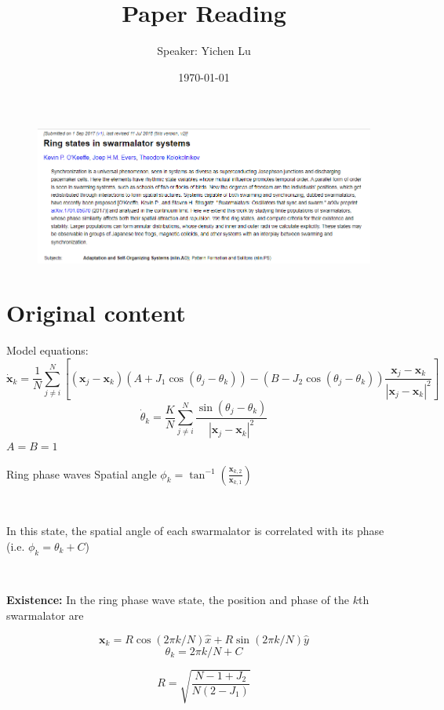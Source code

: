 \documentclass[10pt,aspectratio=43,mathserif,table]{beamer}
\title{Paper Reading}
\author{Speaker: Yichen Lu\quad \newline  \newline \quad }
\institute{\fontsize{8pt}{14pt}}
\date{\today}
\begin{document}
\begin{frame}
    \begin{figure}
        \centering
        \includegraphics[width=\textwidth]{title.png}
    \end{figure}
\end{frame}

\section{Original content}

\begin{frame}
    Model equations:
    {
    \small
    $$
    \dot{\mathbf{x}}_k=\frac{1}{N}\sum_{j\ne i}^N{\left[ \left( \mathbf{x}_j-\mathbf{x}_k \right) \left( A+J_1\cos \left( \theta _j-\theta _k \right) \right) -\left( B-J_2\cos \left( \theta _j-\theta _k \right) \right) \frac{\mathbf{x}_j-\mathbf{x}_k}{\left| \mathbf{x}_j-\mathbf{x}_k \right|^2} \right]}
    $$
    $$
    \dot{\theta}_k=\frac{K}{N}\sum_{j\ne i}^N{\frac{\sin \left( \theta _j-\theta _k \right)}{\left| \mathbf{x}_j-\mathbf{x}_k \right|^2}}
    $$
    }
    $A=B=1$
\end{frame}

\begin{frame}{Ring phase waves}
    Spatial angle $\phi _k=\tan ^{-1}\left( \frac{\mathbf{x}_{k,2}}{\mathbf{x}_{k,1}} \right) $

    $ $

    In this state, the spatial angle of each swarmalator is correlated with its phase (i.e. $\phi _k=\theta _k + C$)

    $ $

    \textbf{Existence: } In the ring phase wave state, the position and phase of the $k$th swarmalator are

    $$
    \mathbf{x}_k=R\cos \left( 2\pi k/N \right) \hat{x}+R\sin \left( 2\pi k/N \right) \hat{y}
    $$
    $$
    \theta _k=2\pi k/N+C
    $$

    $$
    R=\sqrt{\frac{N-1+J_2}{N\left( 2-J_1 \right)}}
    $$

\end{frame}
\end{document}
